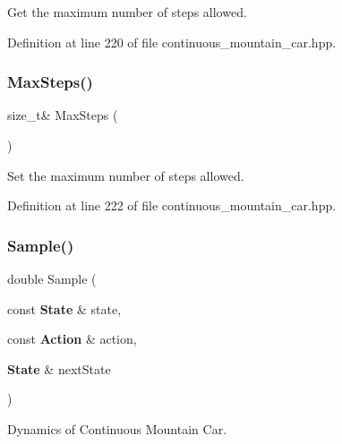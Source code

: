 Get the maximum number of steps allowed. 



Definition at line 220 of file continuous\+\_\+mountain\+\_\+car.\+hpp.

\mbox{\label{classmlpack_1_1rl_1_1ContinuousMountainCar_a64c84cebc489c6fdfd7f057e127b0aef}} 
\subsubsection{Max\+Steps()\hspace{0.1cm}{\footnotesize\ttfamily [2/2]}}
{\footnotesize\ttfamily size\+\_\+t\& Max\+Steps (\begin{DoxyParamCaption}{ }\end{DoxyParamCaption})\hspace{0.3cm}{\ttfamily [inline]}}



Set the maximum number of steps allowed. 



Definition at line 222 of file continuous\+\_\+mountain\+\_\+car.\+hpp.

\mbox{\label{classmlpack_1_1rl_1_1ContinuousMountainCar_a311ac19edc537dee94f37b7cce93d908}} 
\subsubsection{Sample()\hspace{0.1cm}{\footnotesize\ttfamily [1/2]}}
{\footnotesize\ttfamily double Sample (\begin{DoxyParamCaption}\item[{const \textbf{ State} \&}]{state,  }\item[{const \textbf{ Action} \&}]{action,  }\item[{\textbf{ State} \&}]{next\+State }\end{DoxyParamCaption})\hspace{0.3cm}{\ttfamily [inline]}}



Dynamics of Continuous Mountain Car. 

